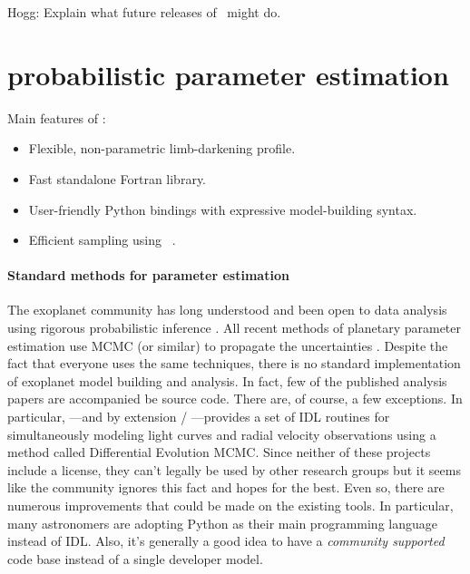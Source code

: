 \documentclass[letterpaper,12pt,preprint]{hack_aastex}
\newcommand{\Turnstile}{\package{IronHorse}}
\newcommand{\Bart}{\package{Bart}}
\newcommand{\emcee}{\package{emcee}}
\begin{document}
Hogg:  Explain what future releases of \Turnstile\ might do.


\section{probabilistic parameter estimation}

Main features of \Bart:
\begin{itemize}
\item Flexible, non-parametric limb-darkening profile.
\item Fast standalone Fortran library.
\item User-friendly Python bindings with expressive model-building syntax.
\item Efficient sampling using \emcee\ \citep{emcee}.
\end{itemize}

\paragraph{Standard methods for parameter estimation}
The exoplanet community has long understood and been open to data analysis
using rigorous probabilistic inference \citep[][for example]{ford}.
All recent methods of planetary parameter estimation use MCMC (or similar) to
propagate the uncertainties \citep[][to name only a few]{barclay,dressing,%
kepler5,kepler4}.
Despite the fact that everyone uses the same techniques, there is no standard
implementation of exoplanet model building and analysis.
In fact, few of the published analysis papers are accompanied be source code.
There are, of course, a few exceptions.
In particular,  \citep{exofast}---and by extension
/ \citep{autokep}---provides a set of IDL
routines for simultaneously modeling light curves and radial velocity
observations using a method called Differential Evolution MCMC.%
Since neither of these projects include a license, they can't legally be used
by other research groups but it seems like the community ignores this fact and
hopes for the best.
Even so, there are numerous improvements that could be made on the existing
tools.
In particular, many astronomers are adopting Python as their main programming
language instead of IDL.
Also, it's generally a good idea to have a \emph{community supported} code
base instead of a single developer model.


\citet{mandel}
\end{document}
